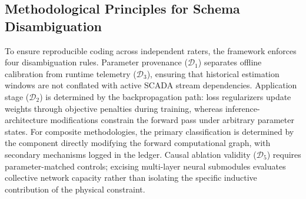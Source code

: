 \subsection{Methodological Principles for Schema Disambiguation}
To ensure reproducible coding across independent raters, the framework enforces four disambiguation rules. Parameter provenance ($\mathcal{D}_1$) separates offline calibration from runtime telemetry ($\mathcal{D}_3$), ensuring that historical estimation windows are not conflated with active SCADA stream dependencies. Application stage ($\mathcal{D}_2$) is determined by the backpropagation path: loss regularizers update weights through objective penalties during training, whereas inference-architecture modifications constrain the forward pass under arbitrary parameter states. For composite methodologies, the primary classification is determined by the component directly modifying the forward computational graph, with secondary mechanisms logged in the ledger. Causal ablation validity ($\mathcal{D}_5$) requires parameter-matched controls; excising multi-layer neural submodules evaluates collective network capacity rather than isolating the specific inductive contribution of the physical constraint.

